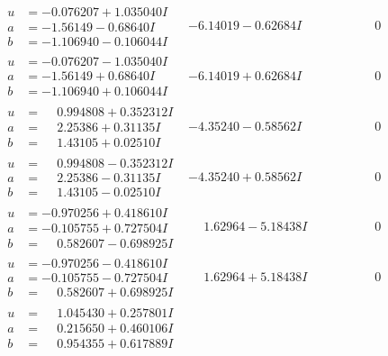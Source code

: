 \documentclass[1p]{elsarticle_modified}
\theoremstyle{definition}
\begin{document}
$$\begin{array}{c|c|c}
\begin{aligned}
u &= -0.076207 + 1.035040 I \\
a &= -1.56149 - 0.68640 I \\
b &= -1.106940 - 0.106044 I\end{aligned}
 & -6.14019 - 0.62684 I & \phantom{-0.000000 } 0 \\ \hline\begin{aligned}
u &= -0.076207 - 1.035040 I \\
a &= -1.56149 + 0.68640 I \\
b &= -1.106940 + 0.106044 I\end{aligned}
 & -6.14019 + 0.62684 I & \phantom{-0.000000 } 0 \\ \hline\begin{aligned}
u &= \phantom{-}0.994808 + 0.352312 I \\
a &= \phantom{-}2.25386 + 0.31135 I \\
b &= \phantom{-}1.43105 + 0.02510 I\end{aligned}
 & -4.35240 - 0.58562 I & \phantom{-0.000000 } 0 \\ \hline\begin{aligned}
u &= \phantom{-}0.994808 - 0.352312 I \\
a &= \phantom{-}2.25386 - 0.31135 I \\
b &= \phantom{-}1.43105 - 0.02510 I\end{aligned}
 & -4.35240 + 0.58562 I & \phantom{-0.000000 } 0 \\ \hline\begin{aligned}
u &= -0.970256 + 0.418610 I \\
a &= -0.105755 + 0.727504 I \\
b &= \phantom{-}0.582607 - 0.698925 I\end{aligned}
 & \phantom{-}1.62964 - 5.18438 I & \phantom{-0.000000 } 0 \\ \hline\begin{aligned}
u &= -0.970256 - 0.418610 I \\
a &= -0.105755 - 0.727504 I \\
b &= \phantom{-}0.582607 + 0.698925 I\end{aligned}
 & \phantom{-}1.62964 + 5.18438 I & \phantom{-0.000000 } 0 \\ \hline\begin{aligned}
u &= \phantom{-}1.045430 + 0.257801 I \\
a &= \phantom{-}0.215650 + 0.460106 I \\
b &= \phantom{-}0.954355 + 0.617889 I\end{aligned}

\end{array}$$
\end{document}
